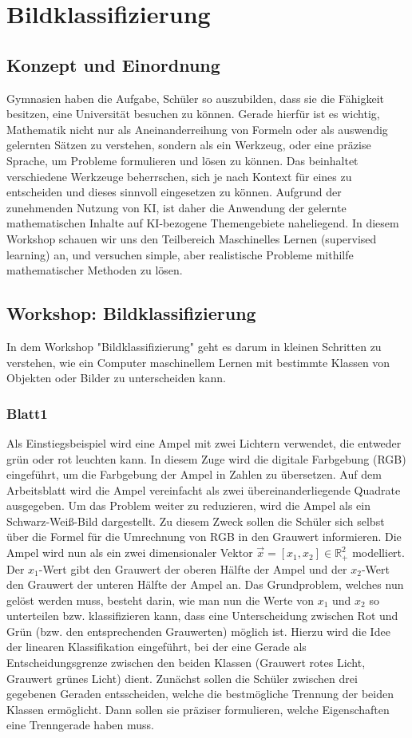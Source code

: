 \chapter{Bildklassifizierung}

    \section{Konzept und Einordnung}
    Gymnasien haben die Aufgabe, Schüler so auszubilden, dass sie die Fähigkeit besitzen, eine Universität besuchen zu können. Gerade hierfür ist es wichtig, Mathematik nicht nur als Aneinanderreihung von Formeln oder als auswendig gelernten Sätzen zu verstehen, sondern als ein Werkzeug, oder eine präzise Sprache, um Probleme formulieren und lösen zu können. Das beinhaltet verschiedene Werkzeuge beherrschen, sich je nach Kontext für eines zu entscheiden und dieses sinnvoll eingesetzen zu können.
    Aufgrund der zunehmenden Nutzung von KI, ist daher die Anwendung der gelernte mathematischen Inhalte auf KI-bezogene Themengebiete naheliegend.
    In diesem Workshop schauen wir uns den Teilbereich Maschinelles Lernen (supervised learning) an, und versuchen simple, aber realistische Probleme mithilfe mathematischer Methoden zu lösen.

    \section{Workshop: Bildklassifizierung}
        In dem Workshop "Bildklassifizierung" geht es darum in kleinen Schritten zu verstehen, wie ein Computer maschinellem Lernen mit  bestimmte Klassen von Objekten oder Bilder zu unterscheiden kann.
        \subsection{Blatt1}
            Als Einstiegsbeispiel wird eine Ampel mit zwei Lichtern verwendet, die entweder grün oder rot leuchten kann. In diesem Zuge wird die digitale Farbgebung (RGB) eingeführt, um die Farbgebung der Ampel in Zahlen zu übersetzen. Auf dem Arbeitsblatt wird die Ampel vereinfacht als zwei übereinanderliegende Quadrate ausgegeben.
            Um das Problem weiter zu reduzieren, wird die Ampel  als ein Schwarz-Weiß-Bild dargestellt. Zu diesem Zweck sollen die Schüler sich selbst über die Formel für die Umrechnung von RGB in den Grauwert informieren. Die Ampel wird nun als ein zwei dimensionaler Vektor $\vec{x}=[x_1, x_2] \in \mathbb{R}_+^2$ modelliert.
            Der $x_1$-Wert gibt den Grauwert der oberen Hälfte der Ampel und der $x_2$-Wert den Grauwert der unteren Hälfte der Ampel an.
            Das Grundproblem, welches nun gelöst werden muss, besteht darin, wie man nun die Werte von $x_1$ und $x_2$ so unterteilen bzw. klassifizieren kann, dass eine Unterscheidung zwischen Rot und Grün (bzw. den entsprechenden Grauwerten) möglich ist.
            Hierzu wird die Idee der linearen Klassifikation eingeführt, bei der eine Gerade als Entscheidungsgrenze zwischen den beiden Klassen (Grauwert rotes Licht, Grauwert grünes Licht) dient.
            Zunächst sollen die Schüler zwischen drei gegebenen Geraden entsscheiden, welche die bestmögliche Trennung der beiden Klassen ermöglicht. Dann sollen sie präziser formulieren, welche Eigenschaften eine Trenngerade haben muss.
